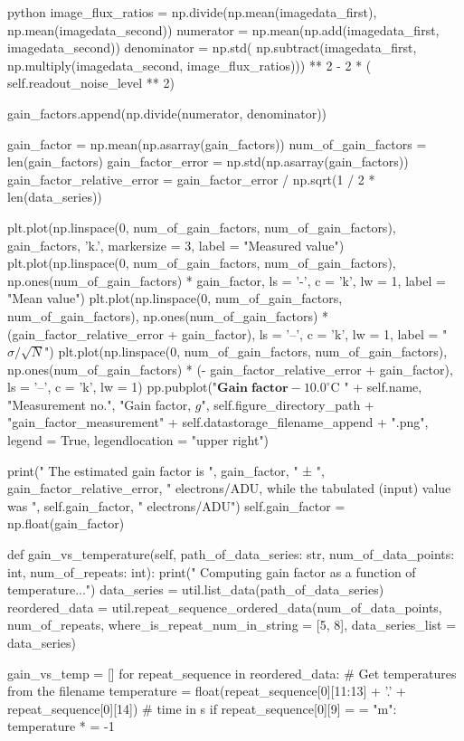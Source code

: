 \documentclass[../main.tex]{subfiles}
\begin{document}
\begin{mintedbox}{python}
image_flux_ratios  =  np.divide(np.mean(imagedata_first), np.mean(imagedata_second))
numerator  =  np.mean(np.add(imagedata_first, imagedata_second))
denominator  =  np.std(
np.subtract(imagedata_first, np.multiply(imagedata_second, image_flux_ratios))) ** 2 - 2 * (
self.readout_noise_level ** 2)

gain_factors.append(np.divide(numerator, denominator))

gain_factor  =  np.mean(np.asarray(gain_factors))
num_of_gain_factors  =  len(gain_factors)
gain_factor_error  =  np.std(np.asarray(gain_factors))
gain_factor_relative_error  =  gain_factor_error / np.sqrt(1 / 2 * len(data_series))

plt.plot(np.linspace(0, num_of_gain_factors, num_of_gain_factors), gain_factors, 'k.', markersize = 3,
label = "Measured value")
plt.plot(np.linspace(0, num_of_gain_factors, num_of_gain_factors), np.ones(num_of_gain_factors) * gain_factor,
ls = '-', c = 'k', lw = 1, label = "Mean value")
plt.plot(np.linspace(0, num_of_gain_factors, num_of_gain_factors),
np.ones(num_of_gain_factors) * (gain_factor_relative_error + gain_factor), ls = '--', c = 'k', lw = 1,
label = "$\sigma / \sqrt{N}$")
plt.plot(np.linspace(0, num_of_gain_factors, num_of_gain_factors),
np.ones(num_of_gain_factors) * (- gain_factor_relative_error + gain_factor), ls = '--', c = 'k', lw = 1)
pp.pubplot("$\mathbf{Gain\;factor}-10.0^\circ$C " + self.name, "Measurement no.", "Gain factor, $g$",
self.figure_directory_path + "gain_factor_measurement" + self.datastorage_filename_append + ".png",
legend = True, legendlocation = "upper right")

print("  The estimated gain factor is ", gain_factor, " ± ", gain_factor_relative_error,
" electrons/ADU, while the tabulated (input) value was ", self.gain_factor, " electrons/ADU")
self.gain_factor  =  np.float(gain_factor)

def gain_vs_temperature(self, path_of_data_series: str, num_of_data_points: int, num_of_repeats: int):
print("  Computing gain factor as a function of temperature...")
data_series  =  util.list_data(path_of_data_series)
reordered_data  =  util.repeat_sequence_ordered_data(num_of_data_points, num_of_repeats,
where_is_repeat_num_in_string = [5, 8],
data_series_list = data_series)

gain_vs_temp  =  []
for repeat_sequence in reordered_data:
# Get temperatures from the filename
temperature  =  float(repeat_sequence[0][11:13] + '.' + repeat_sequence[0][14])  # time in s
if repeat_sequence[0][9]  =  =  "m":
temperature * =  -1


\end{mintedbox}
\end{document}
